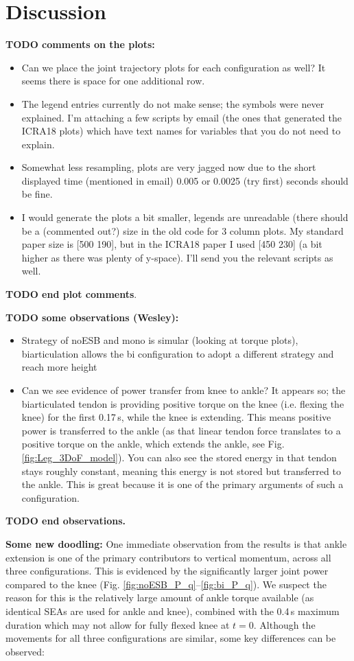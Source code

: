 \documentclass[letterpaper, 10 pt, conference]{ieeeconf}  %
\begin{document}
\section{Discussion} \label{sec:discussion}
\textbf{TODO comments on the plots:}
\begin{itemize}
	\item Can we place the joint trajectory plots for each configuration as well? It seems there is space for one additional row.
	\item The legend entries currently do not make sense; the symbols were never explained. I'm attaching a few scripts by email (the ones that generated the ICRA18 plots) which have text names for variables that you do not need to explain.
	\item Somewhat less resampling, plots are very jagged now due to the short displayed time (mentioned in email) 0.005 or 0.0025 (try first) seconds should be fine.
	\item I would generate the plots a bit smaller, legends are unreadable (there should be a (commented out?) size in the old code for 3 column plots. My standard paper size is [500 190], but in the ICRA18 paper I used [450 230] (a bit higher as there was plenty of y-space). I'll send you the relevant scripts as well.
\end{itemize}
\textbf{TODO end plot comments}.

\textbf{TODO some observations (Wesley):}
\begin{itemize}
	\item Strategy of noESB and mono is simular (looking at torque plots), biarticulation allows the bi configuration to adopt a different strategy and reach more height
	\item Can we see evidence of power transfer from knee to ankle? It appears so; the biarticulated tendon is providing positive torque on the knee (i.e. flexing the knee) for the first 0.17\,s, while the knee is extending. This means positive power is transferred to the ankle (as that linear tendon force translates to a positive torque on the ankle, which extends the ankle, see Fig. \ref{fig:Leg_3DoF_model}). You can also see the stored energy in that tendon stays roughly constant, meaning this energy is not stored but transferred to the ankle. This is great because it is one of the primary arguments of such a configuration.
\end{itemize}
\textbf{TODO end observations.}

\textbf{Some new doodling:}
One immediate observation from the results is that ankle extension is one of the primary contributors to vertical momentum, across all three configurations. This is evidenced by the significantly larger joint power compared to the knee (Fig. \ref{fig:noESB_P_q}--\ref{fig:bi_P_q}). We suspect the reason for this is the relatively large amount of ankle torque available (as identical SEAs are used for ankle and knee), combined with the 0.4\,s maximum duration which may not allow for fully flexed knee at $t=0$. Although the movements for all three configurations are similar, some key differences can be observed:
\end{document}
